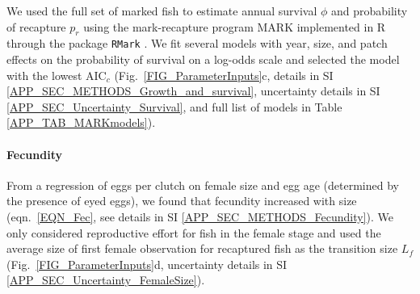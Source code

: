 \documentclass[12pt, oneside]{article}   	%
\begin{document}

We used the full set of marked fish to estimate annual survival $\phi$ and probability of recapture $p_r$ using the mark-recapture program MARK implemented in R through the package \texttt{RMark} \citep{RMark_Laake2013}. We fit several models with year, size, and patch effects on the probability of survival on a log-odds scale and selected the model with the lowest $\text{AIC}_c$ (Fig.\ \ref{FIG_ParameterInputs}c, details in SI \ref{APP_SEC_METHODS_Growth_and_survival}, uncertainty details in SI \ref{APP_SEC_Uncertainty_Survival}, and full list of models in Table \ref{APP_TAB_MARKmodels}). %

\paragraph*{Fecundity}

From a regression of eggs per clutch on female size and egg age (determined by the presence of eyed eggs), we found that fecundity increased with size (eqn.\ \ref{EQN_Fec}, see details in SI \ref{APP_SEC_METHODS_Fecundity}). We only considered reproductive effort for fish in the female stage and used the average size of first female observation for recaptured fish as the transition size $L_f$ (Fig.\ \ref{FIG_ParameterInputs}d, uncertainty details in SI \ref{APP_SEC_Uncertainty_FemaleSize}).
\end{document}
